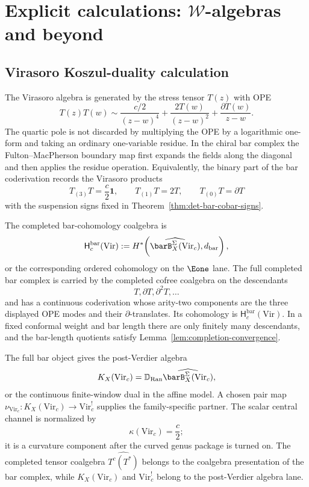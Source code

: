 
\section{Explicit calculations: $\mathcal{W}$-algebras and beyond}
\label{sec:w-algebras-explicit-completion}


\subsection{Virasoro Koszul-duality calculation}

\begin{example}
\label{ex:virasoro-completion-chiral}
The Virasoro algebra is generated by the stress tensor $T(z)$ with
OPE
\[
T(z)T(w)\sim
\frac{c/2}{(z-w)^4}
+\frac{2T(w)}{(z-w)^2}
+\frac{\partial T(w)}{z-w}.
\]
The quartic pole is not discarded by multiplying the OPE by a logarithmic
one-form and taking an ordinary one-variable residue. In the chiral bar
complex the Fulton--MacPherson boundary map first expands the fields
along the diagonal and then applies the residue operation. Equivalently,
the binary part of the bar coderivation records the Virasoro products
\[
T_{(3)}T=\frac{c}{2}\mathbf 1,\qquad
T_{(1)}T=2T,\qquad
T_{(0)}T=\partial T
\]
with the suspension signs fixed in Theorem~\ref{thm:det-bar-cobar-signs}.

The completed bar-cohomology coalgebra is
\[
\mathsf H_c^{\mathrm{bar}}(\mathrm{Vir})
:=H^*\!\left(
\widehat{\barB_X^\Sigma(\mathrm{Vir}_c)},
d_{\mathrm{bar}}
\right),
\]
or the corresponding ordered cohomology on the $\Eone$ lane.  The
full completed bar complex is carried by the completed cofree
coalgebra on the descendants
\[
T,\partial T,\partial^2T,\ldots
\]
and has a continuous coderivation whose arity-two components are the
three displayed OPE modes and their $\partial$-translates. Its
cohomology is $\mathsf H_c^{\mathrm{bar}}(\mathrm{Vir})$. In a fixed conformal
weight and bar length there are only finitely many descendants, and the
bar-length quotients satisfy Lemma~\ref{lem:completion-convergence}.

The full bar object gives the post-Verdier algebra
\[
K_X(\mathrm{Vir}_c)
=\mathbb D_{\operatorname{Ran}}
\widehat{\barB_X^\Sigma(\mathrm{Vir}_c)},
\]
or the continuous finite-window dual in the affine model.  A chosen
pair map $\nu_{\mathrm{Vir}_c}\colon K_X(\mathrm{Vir}_c)
\to\mathrm{Vir}_c^!$ supplies the family-specific partner. The scalar
central channel is normalized by
\[
\kappa(\mathrm{Vir}_c)=\frac{c}{2};
\]
it is a curvature component after the curved genus package is
turned on.  The completed tensor coalgebra $\widehat{T^c(T^*)}$
belongs to the coalgebra presentation of the bar complex, while
$K_X(\mathrm{Vir}_c)$ and $\mathrm{Vir}_c^!$ belong to the
post-Verdier algebra lane.
\end{example}

